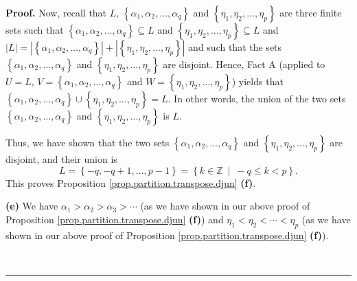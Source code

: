 \documentclass[numbers=enddot,12pt,final,onecolumn,notitlepage]{scrartcl}%
\theoremstyle{definition}
\newenvironment{proof}[1][Proof]{\noindent\textbf{#1.} }{\ \rule{0.5em}{0.5em}}
\newenvironment{verlong}{}{}
\begin{document}
\begin{verlong}
\begin{proof}
Now, recall that $L$, $\left\{  \alpha_{1},\alpha_{2},\ldots,\alpha
_{q}\right\}  $ and $\left\{  \eta_{1},\eta_{2},\ldots,\eta_{p}\right\}  $ are
three finite sets such that $\left\{  \alpha_{1},\alpha_{2},\ldots,\alpha
_{q}\right\}  \subseteq L$ and $\left\{  \eta_{1},\eta_{2},\ldots,\eta
_{p}\right\}  \subseteq L$ and $\left\vert L\right\vert =\left\vert \left\{
\alpha_{1},\alpha_{2},\ldots,\alpha_{q}\right\}  \right\vert +\left\vert
\left\{  \eta_{1},\eta_{2},\ldots,\eta_{p}\right\}  \right\vert $ and such
that the sets $\left\{  \alpha_{1},\alpha_{2},\ldots,\alpha_{q}\right\}  $ and
$\left\{  \eta_{1},\eta_{2},\ldots,\eta_{p}\right\}  $ are disjoint. Hence,
Fact A (applied to $U=L$, $V=\left\{  \alpha_{1},\alpha_{2},\ldots,\alpha
_{q}\right\}  $ and $W=\left\{  \eta_{1},\eta_{2},\ldots,\eta_{p}\right\}  $)
yields that $\left\{  \alpha_{1},\alpha_{2},\ldots,\alpha_{q}\right\}
\cup\left\{  \eta_{1},\eta_{2},\ldots,\eta_{p}\right\}  =L$. In other words,
the union of the two sets $\left\{  \alpha_{1},\alpha_{2},\ldots,\alpha
_{q}\right\}  $ and $\left\{  \eta_{1},\eta_{2},\ldots,\eta_{p}\right\}  $ is
$L$.

Thus, we have shown that the two sets $\left\{  \alpha_{1},\alpha_{2}%
,\ldots,\alpha_{q}\right\}  $ and $\left\{  \eta_{1},\eta_{2},\ldots,\eta
_{p}\right\}  $ are disjoint, and their union is
\[
L=\left\{  -q,-q+1,\ldots,p-1\right\}  =\left\{  k\in\mathbb{Z}\ \mid\ -q\leq
k<p\right\}  .
\]
This proves Proposition \ref{prop.partition.transpose.djun} \textbf{(f)}.

\textbf{(e)} We have $\alpha_{1}>\alpha_{2}>\alpha_{3}>\cdots$ (as we have
shown in our above proof of Proposition \ref{prop.partition.transpose.djun}
\textbf{(f)}) and $\eta_{1}<\eta_{2}<\cdots<\eta_{p}$ (as we have shown in our
above proof of Proposition \ref{prop.partition.transpose.djun} \textbf{(f)}).


\end{proof}
\end{verlong}
\end{document}
